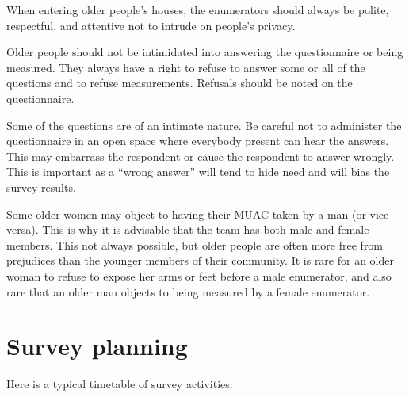 \documentclass[12pt,a4paper]{book}
\theoremstyle{definition}
\theoremstyle{definition}
\theoremstyle{definition}
\theoremstyle{remark}
\begin{document}
When entering older people's houses, the enumerators should always be
polite, respectful, and attentive not to intrude on people's privacy.

Older people should not be intimidated into answering the questionnaire
or being measured. They always have a right to refuse to answer some or
all of the questions and to refuse measurements. Refusals should be
noted on the questionnaire.

Some of the questions are of an intimate nature. Be careful not to
administer the questionnaire in an open space where everybody present
can hear the answers. This may embarrass the respondent or cause the
respondent to answer wrongly. This is important as a ``wrong answer''
will tend to hide need and will bias the survey results.

Some older women may object to having their MUAC taken by a man (or vice
versa). This is why it is advisable that the team has both male and
female members. This not always possible, but older people are often
more free from prejudices than the younger members of their community.
It is rare for an older woman to refuse to expose her arms or feet
before a male enumerator, and also rare that an older man objects to
being measured by a female enumerator.

\hypertarget{survey-planning}{%
\section{Survey planning}\label{survey-planning}}

Here is a typical timetable of survey activities:
\end{document}
